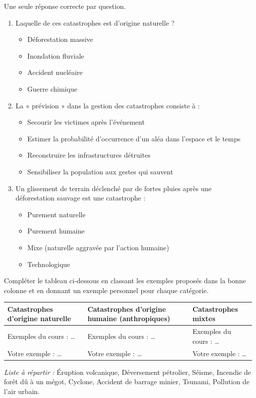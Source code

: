 \documentclass[11pt]{article}
\begin{document}
\begin{exercice}
Une seule réponse correcte par question.
\begin{enumerate}
    \item Laquelle de ces catastrophes est d'origine naturelle ?
    \begin{itemize}
        \item[A] Déforestation massive
        \item[B] Inondation fluviale
        \item[C] Accident nucléaire
        \item[D] Guerre chimique
    \end{itemize}
    \item La « prévision » dans la gestion des catastrophes consiste à :
    \begin{itemize}
        \item[A] Secourir les victimes après l'événement
        \item[B] Estimer la probabilité d'occurrence d'un aléa dans l'espace et le temps
        \item[C] Reconstruire les infrastructures détruites
        \item[D] Sensibiliser la population aux gestes qui sauvent
    \end{itemize}
    \item Un glissement de terrain déclenché par de fortes pluies après une déforestation sauvage est une catastrophe :
    \begin{itemize}
        \item[A] Purement naturelle
        \item[B] Purement humaine
        \item[C] Mixe (naturelle aggravée par l'action humaine)
        \item[D] Technologique
    \end{itemize}
\end{enumerate}
\end{exercice}

\begin{exercice}
Compléter le tableau ci-dessous en classant les exemples proposés dans la bonne colonne et en donnant un exemple personnel pour chaque catégorie.

\medskip
\begin{tabularx}{\linewidth}{|X|X|X|}
\hline
\textbf{Catastrophes d'origine naturelle} & \textbf{Catastrophes d'origine humaine (anthropiques)} & \textbf{Catastrophes mixtes} \\
\hline
Exemples du cours : \dots & Exemples du cours : \dots & Exemples du cours : \dots \\
\hline
Votre exemple : \dots & Votre exemple : \dots & Votre exemple : \dots \\
\hline
\end{tabularx}

\medskip
\textit{Liste à répartir :} Éruption volcanique, Déversement pétrolier, Séisme, Incendie de forêt dû à un mégot, Cyclone, Accident de barrage minier, Tsunami, Pollution de l'air urbain.
\end{exercice}
\end{document}
